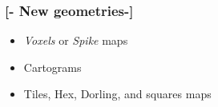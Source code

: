 \documentclass[xcolor=x11names,aspectratio=169, compress]{beamer}
\renewcommand{\(}{\begin{columns}}
\renewcommand{\)}{\end{columns}}
\newcommand{\<}[1]{\begin{column}{#1}}
\renewcommand{\>}{\end{column}}
\begin{document}
\begin{frame} %
\frametitle{\textcolor{brique}{[-  \textbf{New geometries}-]}}
\begin{itemize}
   \item  \textit{Voxels} or \textit{Spike} maps   %
    \item  Cartograms  %
    \item  Tiles, Hex, Dorling,  and squares maps
\end{itemize}
\end{frame}



\end{document}
